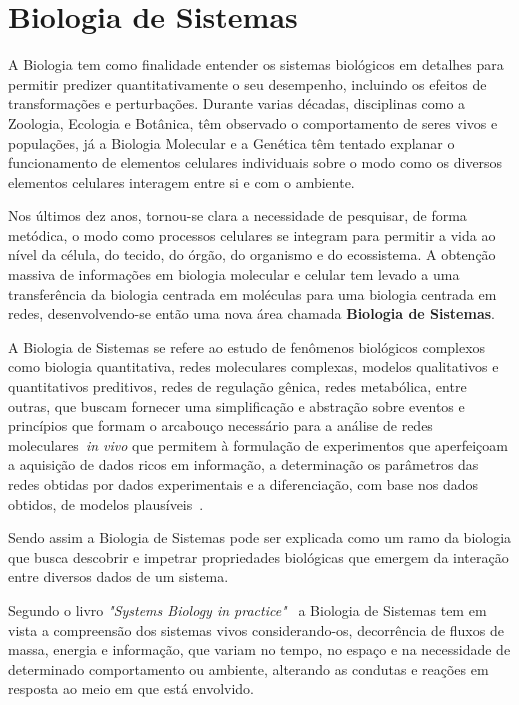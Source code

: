 ﻿\chapter{Biologia de Sistemas}

A Biologia tem como finalidade entender os sistemas biológicos em detalhes para permitir predizer quantitativamente o seu desempenho, incluindo os efeitos de transformações e perturbações. Durante varias décadas, disciplinas como a Zoologia, Ecologia e Botânica, têm observado o comportamento de seres vivos e populações, já a Biologia Molecular e a Genética têm tentado explanar o funcionamento de elementos celulares individuais sobre o modo como os diversos elementos celulares interagem entre si e com o ambiente.

Nos últimos dez anos, tornou-se clara a necessidade de pesquisar, de forma metódica, o modo como processos celulares se integram para permitir a vida ao nível da célula, do tecido, do órgão, do organismo e do ecossistema. A obtenção massiva de informações em biologia molecular e celular tem levado a uma transferência da biologia centrada em moléculas para uma biologia centrada em redes, desenvolvendo-se então uma nova área chamada \textbf{Biologia de Sistemas}.

 A Biologia de Sistemas se refere ao estudo de fenômenos biológicos complexos como biologia quantitativa, redes moleculares complexas, modelos qualitativos e quantitativos preditivos, redes de regulação gênica, redes metabólica, entre outras, que buscam fornecer uma simplificação e abstração sobre eventos e princípios que formam o arcabouço necessário para a análise de redes moleculares~\textit{in vivo} que permitem à formulação de experimentos que aperfeiçoam a aquisição de dados ricos em informação, a determinação os parâmetros das redes obtidas por dados experimentais e a diferenciação, com base nos dados obtidos, de modelos plausíveis~\cite{Nicholson2006}.

Sendo assim a Biologia de Sistemas pode ser explicada como um ramo da biologia que busca descobrir e impetrar propriedades biológicas que emergem da interação entre diversos dados de um sistema.

Segundo o livro \textit{"Systems Biology in practice"}~\cite{Klipp2005} a  Biologia de Sistemas tem em vista a compreensão dos sistemas vivos considerando-os, decorrência de fluxos de massa, energia e informação, que variam no tempo, no espaço e na necessidade de determinado comportamento ou ambiente, alterando as condutas e reações em resposta ao meio em que está envolvido.

